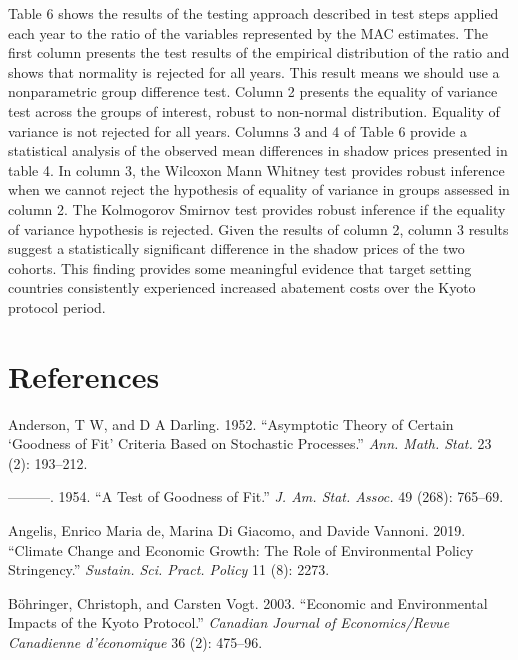 \documentclass[
  10pt,
]{article}
\begin{document}
Table 6 shows the results of the testing approach described in test
steps applied each year to the ratio of the variables represented by the
MAC estimates. The first column presents the test results of the
empirical distribution of the ratio and shows that normality is rejected
for all years. This result means we should use a nonparametric group
difference test. Column 2 presents the equality of variance test across
the groups of interest, robust to non-normal distribution. Equality of
variance is not rejected for all years. Columns 3 and 4 of Table 6
provide a statistical analysis of the observed mean differences in
shadow prices presented in table 4. In column 3, the Wilcoxon Mann
Whitney test provides robust inference when we cannot reject the
hypothesis of equality of variance in groups assessed in column 2. The
Kolmogorov Smirnov test provides robust inference if the equality of
variance hypothesis is rejected. Given the results of column 2, column 3
results suggest a statistically significant difference in the shadow
prices of the two cohorts. This finding provides some meaningful
evidence that target setting countries consistently experienced
increased abatement costs over the Kyoto protocol period.

\newpage

\hypertarget{references}{%
\section*{References}\label{references}}

\hypertarget{refs}{}
\leavevmode\hypertarget{ref-Anderson1952}{}%
Anderson, T W, and D A Darling. 1952. ``Asymptotic Theory of Certain
`Goodness of Fit' Criteria Based on Stochastic Processes.'' \emph{Ann.
Math. Stat.} 23 (2): 193--212.

\leavevmode\hypertarget{ref-Anderson1954}{}%
---------. 1954. ``A Test of Goodness of Fit.'' \emph{J. Am. Stat.
Assoc.} 49 (268): 765--69.

\leavevmode\hypertarget{ref-De_Angelis2019}{}%
Angelis, Enrico Maria de, Marina Di Giacomo, and Davide Vannoni. 2019.
``Climate Change and Economic Growth: The Role of Environmental Policy
Stringency.'' \emph{Sustain. Sci. Pract. Policy} 11 (8): 2273.

\leavevmode\hypertarget{ref-Bohringer2003}{}%
Böhringer, Christoph, and Carsten Vogt. 2003. ``Economic and
Environmental Impacts of the Kyoto Protocol.'' \emph{Canadian Journal of
Economics/Revue Canadienne d'économique} 36 (2): 475--96.
\end{document}
